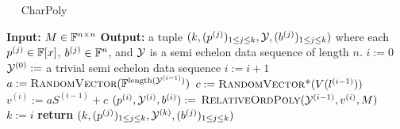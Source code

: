 \begin{algorithm}
\caption{$\quad$ \sc CharPoly}
\label{algcharpoly}
\begin{algorithmic}
\STATE \textbf{Input:} $M \in \mathbb{F}^{n\times n}$
\STATE \textbf{Output:} a tuple $(k, (p^{(j)})_{1\leq j\leq k}, \mathcal{Y}, (b^{(j)})_{1\leq j\leq k})$ 
where each $p^{(j)}\in\mathbb{F}[x]$, $b^{(j)}\in\mathbb{F}^n$, and $\mathcal{Y}$ is a semi 
\STATE \hspace*{0mm} %
echelon data sequence of length $n$.
\vspace*{2mm}
\STATE $i := 0$
\STATE $\mathcal{Y}^{(0)}:=$ a trivial semi echelon data sequence
    \STATE $i := i + 1$
    \STATE $a := \mbox{\sc RandomVector}(\mathbb{F}^{\mathrm{length}(\mathcal{Y}^{(i-1)})})$
    \STATE $c := \mbox{\sc RandomVector*}(V(l^{(i-1)}))$
    \STATE $v^{(i)} := aS^{(i-1)} + c$
	\STATE 
       \hspace*{10mm} 
    \STATE $(p^{(i)},\mathcal{Y}^{(i)},b^{(i)}) :=$
             $\mbox{\sc RelativeOrdPoly}(\mathcal{Y}^{(i-1)},v^{(i)},M)$
\STATE  \hspace*{10mm} 
\ENDWHILE
\STATE $k := i$
\STATE \textbf{return} $(k,(p^{(j)})_{1 \le j \le k}, 
                       \mathcal{Y}^{(k)}, 
(b^{(j)})_{1 \le j \le k})$
\end{algorithmic}
\end{algorithm}

